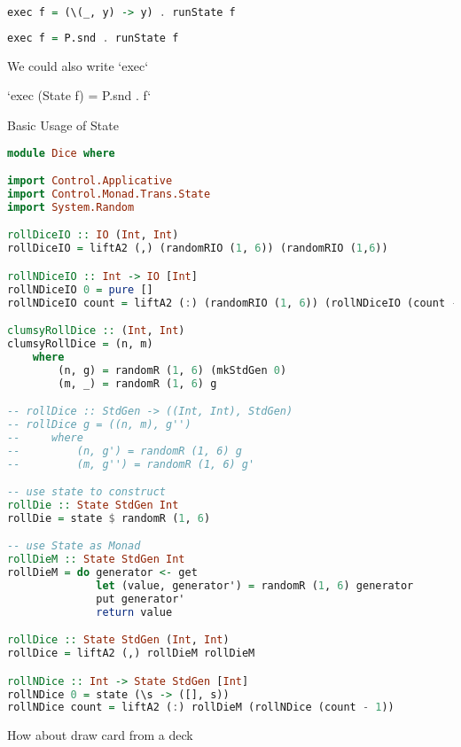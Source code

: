 \begin{lstlisting}[language=haskell]
exec f = (\(_, y) -> y) . runState f
\end{lstlisting}


\begin{lstlisting}[language=haskell]
exec f = P.snd . runState f
\end{lstlisting}

We could also write `exec`

`exec (State f) = P.snd . f`


 Basic Usage of State

\begin{lstlisting}[language=haskell]
module Dice where

import Control.Applicative
import Control.Monad.Trans.State
import System.Random

rollDiceIO :: IO (Int, Int)
rollDiceIO = liftA2 (,) (randomRIO (1, 6)) (randomRIO (1,6))

rollNDiceIO :: Int -> IO [Int]
rollNDiceIO 0 = pure []
rollNDiceIO count = liftA2 (:) (randomRIO (1, 6)) (rollNDiceIO (count - 1))

clumsyRollDice :: (Int, Int)
clumsyRollDice = (n, m)
    where
        (n, g) = randomR (1, 6) (mkStdGen 0)
        (m, _) = randomR (1, 6) g

-- rollDice :: StdGen -> ((Int, Int), StdGen)
-- rollDice g = ((n, m), g'')
--     where
--         (n, g') = randomR (1, 6) g
--         (m, g'') = randomR (1, 6) g'

-- use state to construct
rollDie :: State StdGen Int
rollDie = state $ randomR (1, 6)

-- use State as Monad
rollDieM :: State StdGen Int
rollDieM = do generator <- get
              let (value, generator') = randomR (1, 6) generator
              put generator'
              return value

rollDice :: State StdGen (Int, Int)
rollDice = liftA2 (,) rollDieM rollDieM

rollNDice :: Int -> State StdGen [Int]
rollNDice 0 = state (\s -> ([], s))
rollNDice count = liftA2 (:) rollDieM (rollNDice (count - 1))
\end{lstlisting}

How about draw card from a deck


